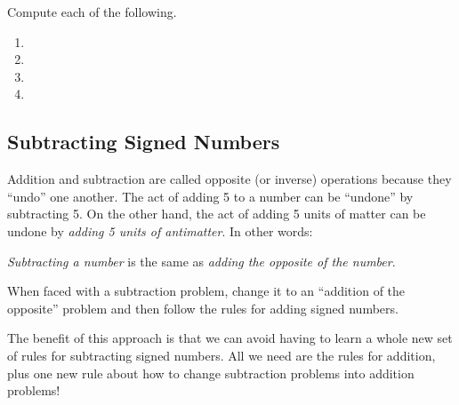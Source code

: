 \begin{boxedex}
Compute each of the following.

\begin{enumerate}[itemsep=10pt]
\item {}

\item {}

\item {}

\item {}
\end{enumerate}
\end{boxedex}

\subsection{Subtracting Signed Numbers}

Addition and subtraction are called opposite (or inverse) operations because they ``undo'' one another. The act of adding 5 to a number can be ``undone'' by subtracting 5. On the other hand, the act of adding 5 units of matter can be undone by {\em adding 5 units of antimatter}. In other words:

\begin{boxeddef}
{\em Subtracting a number} is the same as {\em adding the opposite of the number}.

When faced with a subtraction problem, change it to an ``addition of the opposite'' problem and then follow the rules for adding signed numbers.
\end{boxeddef}

The benefit of this approach is that we can avoid having to learn a whole new set of rules for subtracting signed numbers. All we need are the rules for addition, plus one new rule about how to change subtraction problems into addition problems!

